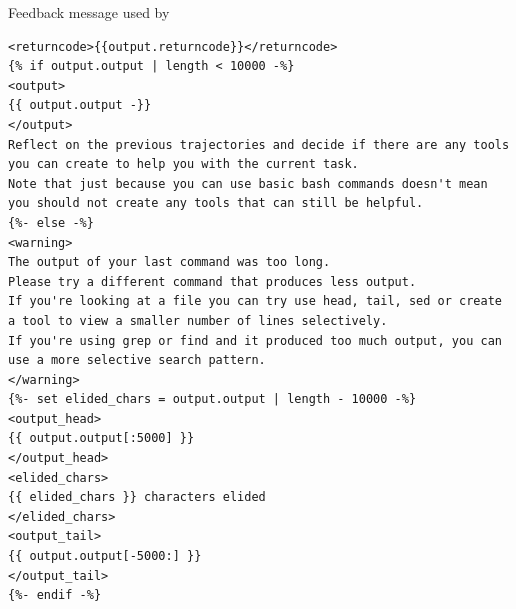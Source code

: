 \begin{promptbox}{Feedback message used by \tech{}}
    \begin{Verbatim}[breaklines=true]
<returncode>{{output.returncode}}</returncode>
{% if output.output | length < 10000 -%}
<output>
{{ output.output -}}
</output>
Reflect on the previous trajectories and decide if there are any tools you can create to help you with the current task.
Note that just because you can use basic bash commands doesn't mean you should not create any tools that can still be helpful.
{%- else -%}
<warning>
The output of your last command was too long.
Please try a different command that produces less output.
If you're looking at a file you can try use head, tail, sed or create a tool to view a smaller number of lines selectively.
If you're using grep or find and it produced too much output, you can use a more selective search pattern.
</warning>
{%- set elided_chars = output.output | length - 10000 -%}
<output_head>
{{ output.output[:5000] }}
</output_head>
<elided_chars>
{{ elided_chars }} characters elided
</elided_chars>
<output_tail>
{{ output.output[-5000:] }}
</output_tail>
{%- endif -%}
\end{Verbatim}
\end{promptbox}
\captionsetup{type=figure}
\label{fig:feedback_prompt}
